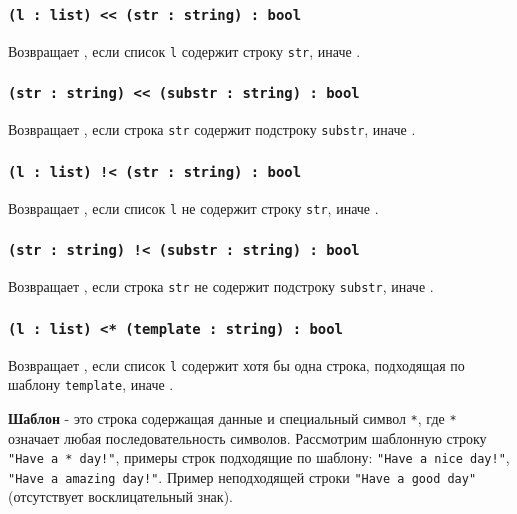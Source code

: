 \subsubsection{\texttt{(l : list) << (str : string) : bool}}

Возвращает \true{}, если список \texttt{l} содержит строку \texttt{str}, иначе \false{}.

\subsubsection{\texttt{(str : string) << (substr : string) : bool}}

Возвращает \true{}, если строка \texttt{str} содержит подстроку \texttt{substr}, иначе \false{}.

\subsubsection{\texttt{(l : list) !< (str : string) : bool}}

Возвращает \true{}, если список \texttt{l} не содержит строку \texttt{str}, иначе \false{}.

\subsubsection{\texttt{(str : string) !< (substr : string) : bool}}

Возвращает \true{}, если строка \texttt{str} не содержит подстроку \texttt{substr}, иначе \false{}.

\subsubsection{\texttt{(l : list) <* (template : string) : bool}}

Возвращает \true{}, если список \texttt{l} содержит хотя бы одна строка, подходящая по шаблону \texttt{template}, иначе \false{}.

{\bf Шаблон} - это строка содержащая данные и специальный символ \texttt{*}, где \texttt{*} означает любая последовательность символов. Рассмотрим шаблонную строку \texttt{"Have a * day!"}, примеры строк подходящие по шаблону: \texttt{"Have a nice day!"}, \texttt{"Have a amazing day!"}. Пример неподходящей строки \texttt{"Have a good day"} (отсутствует восклицательный знак).


